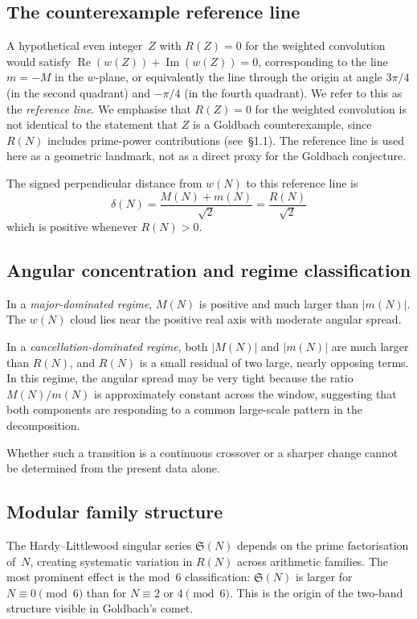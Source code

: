 \documentclass[11pt,a4paper]{article}
\newcommand{\RN}{R(N)}
\newcommand{\MN}{M(N)}
\newcommand{\mN}{m(N)}
\newcommand{\wN}{w(N)}
\begin{document}
\subsection{The counterexample reference line}

A hypothetical even integer~$Z$ with $R(Z) = 0$ for the weighted convolution would satisfy $\operatorname{Re}(w(Z)) + \operatorname{Im}(w(Z)) = 0$, corresponding to the line $m = -M$ in the $w$-plane, or equivalently the line through the origin at angle $3\pi/4$ (in the second quadrant) and $-\pi/4$ (in the fourth quadrant). We refer to this as the \emph{reference line}. We emphasise that $R(Z) = 0$ for the weighted convolution is not identical to the statement that $Z$ is a Goldbach counterexample, since $\RN$ includes prime-power contributions (see~\S1.1). The reference line is used here as a geometric landmark, not as a direct proxy for the Goldbach conjecture.

The signed perpendicular distance from $\wN$ to this reference line is
\begin{equation}
\delta(N) = \frac{\MN + \mN}{\sqrt{2}} = \frac{\RN}{\sqrt{2}}
\end{equation}
which is positive whenever $\RN > 0$.


\subsection{Angular concentration and regime classification}

In a \emph{major-dominated regime}, $\MN$ is positive and much larger than $|\mN|$. The $\wN$ cloud lies near the positive real axis with moderate angular spread.

In a \emph{cancellation-dominated regime}, both $|\MN|$ and $|\mN|$ are much larger than $\RN$, and $\RN$ is a small residual of two large, nearly opposing terms. In this regime, the angular spread may be very tight because the ratio $\MN/\mN$ is approximately constant across the window, suggesting that both components are responding to a common large-scale pattern in the decomposition.

Whether such a transition is a continuous crossover or a sharper change cannot be determined from the present data alone.


\subsection{Modular family structure}

The Hardy--Littlewood singular series $\mathfrak{S}(N)$ depends on the prime factorisation of~$N$, creating systematic variation in $\RN$ across arithmetic families. The most prominent effect is the mod~6 classification: $\mathfrak{S}(N)$ is larger for $N \equiv 0 \pmod{6}$ than for $N \equiv 2$ or $4 \pmod{6}$. This is the origin of the two-band structure visible in Goldbach's comet.
\end{document}
